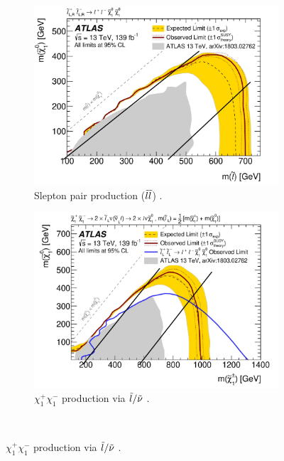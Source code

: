 \begin{figure}[H]
    \centering
    \begin{subfigure}[t!]{0.49\textwidth}
        \includegraphics[width = \textwidth]{Figures/FromOnline/Slepslep.pdf}
        \caption{Slepton pair production ($\Tilde{l}\Tilde{l}$) \cite{sleptonexclusion}.}
        \label{fig:slepslepexclusion}
    \end{subfigure}
    \begin{subfigure}[t!]{0.49\textwidth}
        \includegraphics[width = \textwidth]{Figures/FromOnline/Slepsnu.pdf}
        \caption{$\chi_1^+ \chi_1^-$ production via $\Tilde{l}/\Tilde{\nu}$ \cite{sleptonexclusion}.}
        \label{fig:slepsnuexclusion}
    \end{subfigure}
    \\

\end{figure}
